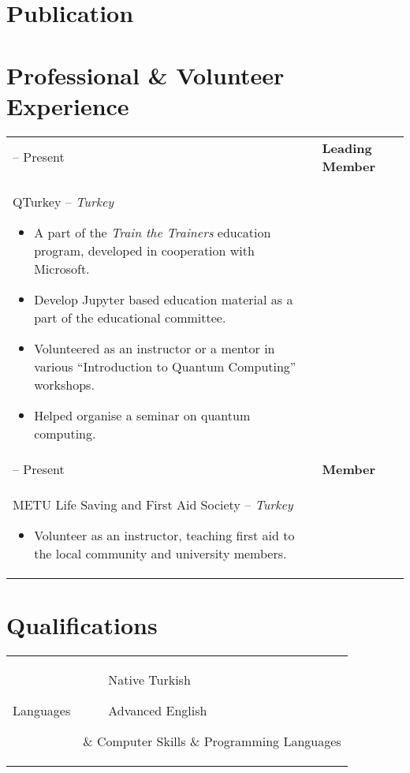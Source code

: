 \documentclass[11pt]{article} %
\makeatletter
\newlength{\firstColumnWidth}
\newlength{\tabusep}
\newlength{\secondColumnWidth}
\newcommand{\tabitem}{~~\llap{--}~~}
\newcommand{\threeecols}[2]{\parbox{
    0.98\secondColumnWidth}{\hfill
    \parbox[t]{0.465\secondColumnWidth}{#1}
    \parbox[t]{0.465\secondColumnWidth}{#2}
    }
}
\newenvironment{twocols}
    {
    \begin{longtable}[h]{%
        @{}%
        >{\raggedleft}p{\firstColumnWidth}%
        @{\hspace{\tabusep}}%
        >{\arraybackslash\raggedright}p{\dimexpr %
            \linewidth-\firstColumnWidth-\tabusep%
        \relax}%
        @{}%
        }
    } {
        \end{longtable}
    }
\makeatother
\begin{document}
\section{Publication}


\newpage
\section{Professional \& Volunteer Experience}
\begin{twocols}
    2019 -- Present & %
        \textbf{Leading Member} \\
        QTurkey -- \textit{Turkey}
        \begin{itemize}
            \item A part of the \emph{Train the Trainers} education program, developed in cooperation with Microsoft.
            \item Develop Jupyter based education material as a part of the educational committee.
            \item Volunteered as an instructor or a mentor in various “Introduction to Quantum Computing” workshops.
            \item Helped organise a seminar on quantum computing.
        \end{itemize} \tabularnewline
    2018 -- Present & %
        \textbf{Member} \\ 
        METU Life Saving and First Aid Society -- \textit{Turkey}
        \begin{itemize}
            \item Volunteer as an instructor, teaching first aid to the local community and university members.
        \end{itemize}
\end{twocols}

\section{Qualifications}

\begin{twocols}
    Languages & \threeecols{\tabitem Native Turkish}{
    \tabitem Advanced English} \tabularnewline & \tabularnewline
    Computer Skills & %
        Programming Languages\\[.5em]
        \threeecols
            {\tabitem C/C++ \par \tabitem Q\# and QDK \par \tabitem \LaTeX}
            {\tabitem Python \par \tabitem Swift \par \tabitem Haskell}\\[.7em]
        Technologies/Frameworks\\[.3em]
        \threeecols {\tabitem git and Github}{\tabitem Qiskit}
\end{twocols}
\end{document}
